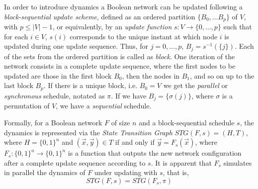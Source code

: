 \documentclass[preprint,12pt]{elsarticle}
\newcommand{\STG}{\textit{STG}}
\begin{document}
In order to introduce dynamics a Boolean network can be updated following a %
\textit{block-sequential update scheme}, defined as an ordered partition $\{B_0, ... B_{p}\}$ of $V$, with $p \leq |V|-1$, %
or equivalently, by an \textit{update function} $s:V\rightarrow \{0,\ldots,p\}$ such that for each $i \in V$, $s(i)$ corresponds to the unique instant at which node $i$ is updated during one update sequence. Thus, for $j=0,\ldots,p$, $B_j=s^{-1}(\{j\})$. Each of the sets from the ordered partition is called as \textit{block}. %
One iteration of the network consists in a complete update sequence, where the first nodes to be updated are those in the first block $B_0$, then the nodes in $B_1$, and so on up to the last block $B_{p}$. %
If there is a unique block, i.e. $B_0=V$ we get the \textit{parallel} or \textit{synchronous} schedule, %
notated as $\pi$. If we have $B_{j}=\{\sigma(j)\}$, where $\sigma$ is a permutation of $V$, we have a \textit{sequential} schedule.\par
Formally, for a Boolean network $F$ of size $n$ and a block-sequential schedule $s$, the dynamics is represented via the \textit{State Transition Graph} $\STG(F,s)=(H,T)$, where $H=\{0,1\}^n$ and $(\vec{x},\vec{y}) \in T$ if and only if $\vec{y}=F_s(\vec{x})$, where $F_s:\{0,1\}^n\rightarrow\{0,1\}^n$ is a function that outputs the new network configuration after a complete update sequence according to $s$. %
It is apparent that $F_s$ simulates in parallel the dynamics of $F$ under updating with $s$, that is, %
$$\STG(F,s)=\STG(F_s,\pi)$$


\end{document}
